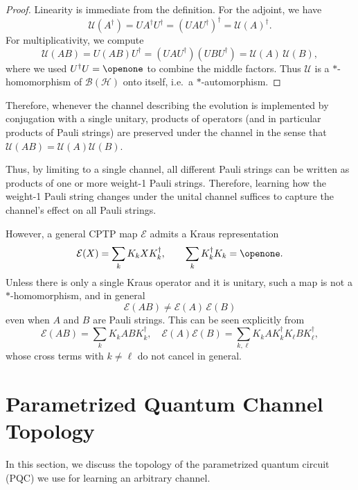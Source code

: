 \documentclass[%
 reprint,
superscriptaddress,
 amsmath,amssymb,
 aps,
]{revtex4-2}
\begin{document}
\begin{proof}
Linearity is immediate from the definition. For the adjoint, we have
\begin{equation}
  \mathcal{U}(A^{\dagger})
  = U A^{\dagger} U^{\dagger}
  = (UAU^{\dagger})^{\dagger}
  = \mathcal{U}(A)^{\dagger}.
\end{equation}
For multiplicativity, we compute
\begin{equation}
  \mathcal{U}(AB)
  = U (AB) U^{\dagger}
  = (UAU^{\dagger})(UBU^{\dagger})
  = \mathcal{U}(A)\,\mathcal{U}(B),
\end{equation}
where we used $U^{\dagger}U=\openone$ to combine the middle factors.
Thus $\mathcal{U}$ is a $*$-homomorphism of $\mathcal{B}(\mathcal{H})$
onto itself, i.e.\ a $*$-automorphism.
\end{proof}

Therefore, whenever the channel describing the evolution is implemented by conjugation with a single unitary, products of operators (and in particular products of Pauli strings) are preserved under the channel in the sense that $\mathcal{U}(AB)=\mathcal{U}(A)\mathcal{U}(B)$.

Thus, by limiting to a single channel, all different Pauli strings can be written as products of one or more weight-1 Pauli strings. Therefore, learning how the weight-1 Pauli string changes under the unital channel suffices to capture the channel's effect on all Pauli strings.

However, a general CPTP map $\mathcal{E}$ admits a Kraus representation
\begin{equation}
  \mathcal{E}(X) = \sum_{k} K_k X K_k^{\dagger},
  \qquad \sum_{k} K_k^{\dagger}K_k = \openone.
\end{equation}
Unless there is only a single Kraus operator and it is unitary, such a map is not a $*$-homomorphism, and in general
\begin{equation}
  \mathcal{E}(AB) \neq \mathcal{E}(A)\,\mathcal{E}(B)
\end{equation}
even when $A$ and $B$ are Pauli strings.
This can be seen explicitly from
\begin{equation}
  \mathcal{E}(AB)
  = \sum_{k} K_k A B K_k^{\dagger},
  \quad
  \mathcal{E}(A)\mathcal{E}(B)
  = \sum_{k,\ell} K_k A K_k^{\dagger} K_{\ell} B K_{\ell}^{\dagger},
\end{equation}
whose cross terms with $k\neq \ell$ do not cancel in general.



\section{Parametrized Quantum Channel Topology}
In this section, we discuss the topology of the parametrized quantum circuit (PQC) we use for learning an arbitrary channel.
\end{document}

